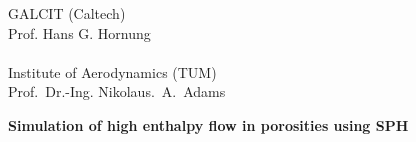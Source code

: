 


% 

\pagestyle{empty}

\begin{center}

\vspace*{-2.8cm}
\begin{minipage}[c]{.30\textwidth}
\end{minipage}
\begin{minipage}[c]{.43\textwidth}
\vspace*{1em}
    {GALCIT (Caltech)\\Prof. Hans G. Hornung \\ \\ Institute of Aerodynamics (TUM) \\ Prof.~Dr.-Ing. Nikolaus.~A.~Adams}%
\end{minipage}
\begin{minipage}[c]{.25\textwidth}
\end{minipage}

\vspace*{4.3cm}
\begin{minipage}[c]{11cm}
{\LARGE\bf 
Simulation of high enthalpy flow in porosities using SPH}
\end{minipage}




\vspace*{1.0cm}


\end{center}
